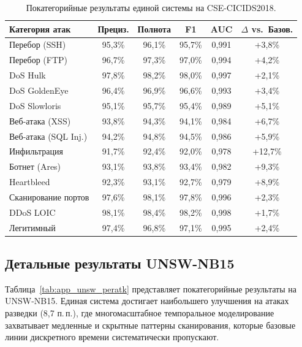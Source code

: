 \begin{table}[htbp]
\centering
\caption{Покатегорийные результаты единой системы на CSE-CICIDS2018.}
\label{tab:app_cicids_peratk}
\begin{tabular}{lccccc}
\toprule
Категория атак & Прециз. & Полнота & F1 & AUC & $\Delta$ vs.\ Базов. \\
\midrule
Перебор (SSH)        & 95,3\% & 96,1\% & 95,7\% & 0,991 & +3,8\% \\
Перебор (FTP)        & 96,7\% & 97,3\% & 97,0\% & 0,994 & +4,2\% \\
DoS Hulk             & 97,8\% & 98,2\% & 98,0\% & 0,997 & +2,1\% \\
DoS GoldenEye        & 96,4\% & 96,9\% & 96,6\% & 0,993 & +3,4\% \\
DoS Slowloris        & 95,1\% & 95,7\% & 95,4\% & 0,989 & +5,1\% \\
Веб-атака (XSS)      & 93,8\% & 94,3\% & 94,1\% & 0,984 & +6,7\% \\
Веб-атака (SQL Inj.) & 94,2\% & 94,8\% & 94,5\% & 0,986 & +5,9\% \\
Инфильтрация         & 91,7\% & 92,4\% & 92,0\% & 0,978 & +12,7\% \\
Ботнет (Ares)        & 93,1\% & 93,8\% & 93,4\% & 0,982 & +9,3\% \\
Heartbleed           & 92,3\% & 93,1\% & 92,7\% & 0,979 & +8,9\% \\
Сканирование портов  & 97,6\% & 98,1\% & 97,8\% & 0,996 & +2,3\% \\
DDoS LOIC            & 98,1\% & 98,4\% & 98,2\% & 0,998 & +1,7\% \\
\midrule
Легитимный           & 97,4\% & 96,8\% & 97,1\% & 0,995 & +2,4\% \\
\bottomrule
\end{tabular}
\end{table}


\subsection{Детальные результаты UNSW-NB15}
\label{app:unsw_detail}

Таблица~\ref{tab:app_unsw_peratk} представляет покатегорийные результаты на UNSW-NB15. Единая система достигает наибольшего улучшения на атаках разведки (8,7 п.\,п.), где многомасштабное темпоральное моделирование захватывает медленные и скрытные паттерны сканирования, которые базовые линии дискретного времени систематически пропускают.

